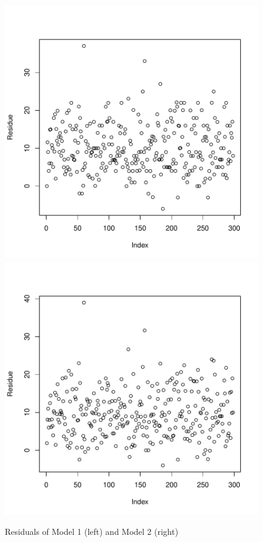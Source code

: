 \documentclass[english,final]{scrartcl}
\begin{document}
\begin{figure}[htbp]
\centering
\includegraphics{Geyser-Analysis-log1_plot}
\hspace{1cm}
\includegraphics{Geyser-Analysis-plm1_plot}
\caption{Residuals of Model 1 (left) and Model 2 (right)}
\label{fig:residue1}
\end{figure}
\end{document}
